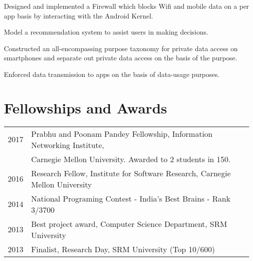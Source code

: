 \documentclass[]{deedy-resume-openfont}
\begin{document}
\begin{minipage}[t]{0.66\textwidth}
\begin{tightemize}
\item Designed and implemented a Firewall which blocks Wifi and mobile data on a per app basis by interacting with the Android Kernel.
\item Model a recommendation system to assist users in making decisions.
\end{tightemize}
\sectionsep

\begin{tightemize} 
\item Constructed an all-encompassing purpose taxonomy for private data access on smartphones and separate out private data access on the basis of the purpose.
\item Enforced data transmission to apps on the basis of data-usage purposes.
\end{tightemize}
\sectionsep




\section{Fellowships and Awards} 
\begin{tabular}{rll}
2017     & Prabhu and Poonam Pandey Fellowship, Information Networking Institute, \\
		 & Carnegie Mellon University. Awarded to 2 students in 150. \\
2016     & Research Fellow, Institute for Software Research, Carnegie Mellon University  \\
2014     & National Programing Contest - India's Best Brains - Rank 3/3700\\
2013	 & Best project	award, Computer Science Department, SRM University\\
2013     & Finalist, Research Day, SRM University (Top 10/600)\\
\end{tabular}
\sectionsep


\end{minipage}
\end{document}
